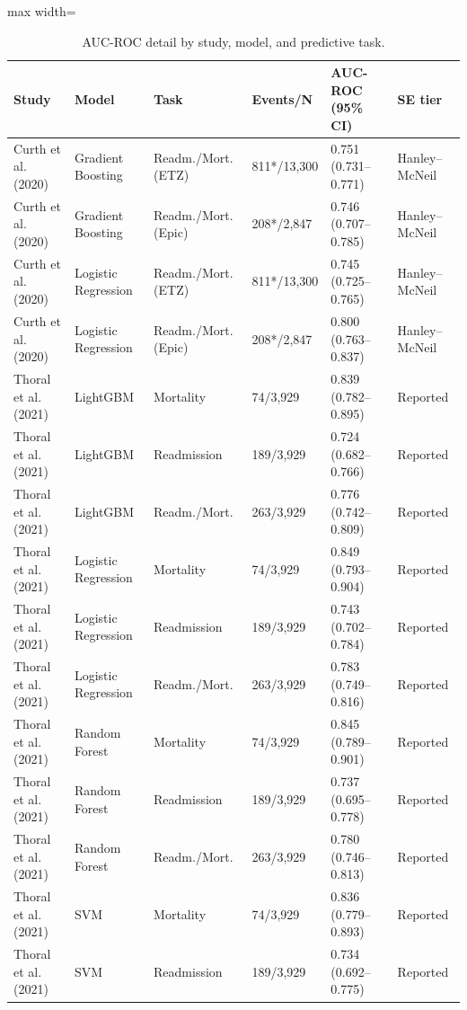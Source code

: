 \begin{table}[H]
\centering
\caption{AUC-ROC detail by study, model, and predictive task.}\label{tab:detalle_auc}
\scriptsize
\begin{adjustbox}{max width=\textwidth}
\begin{tabular}{llllll}
\toprule
\textbf{Study} & \textbf{Model} & \textbf{Task} & \textbf{Events/N} & \textbf{AUC-ROC (95\% CI)} & \textbf{SE tier} \\
\midrule
    Curth et al. (2020) & Gradient Boosting & Readm./Mort. (ETZ) & 811*/13,300 & 0.751 (0.731--0.771) & Hanley--McNeil \\
    Curth et al. (2020) & Gradient Boosting & Readm./Mort. (Epic) & 208*/2,847 & 0.746 (0.707--0.785) & Hanley--McNeil \\
    Curth et al. (2020) & Logistic Regression & Readm./Mort. (ETZ) & 811*/13,300 & 0.745 (0.725--0.765) & Hanley--McNeil \\
    Curth et al. (2020) & Logistic Regression & Readm./Mort. (Epic) & 208*/2,847 & 0.800 (0.763--0.837) & Hanley--McNeil \\
    Thoral et al. (2021) & LightGBM & Mortality & 74/3,929 & 0.839 (0.782--0.895) & Reported \\
    Thoral et al. (2021) & LightGBM & Readmission & 189/3,929 & 0.724 (0.682--0.766) & Reported \\
    Thoral et al. (2021) & LightGBM & Readm./Mort. & 263/3,929 & 0.776 (0.742--0.809) & Reported \\
    Thoral et al. (2021) & Logistic Regression & Mortality & 74/3,929 & 0.849 (0.793--0.904) & Reported \\
    Thoral et al. (2021) & Logistic Regression & Readmission & 189/3,929 & 0.743 (0.702--0.784) & Reported \\
    Thoral et al. (2021) & Logistic Regression & Readm./Mort. & 263/3,929 & 0.783 (0.749--0.816) & Reported \\
    Thoral et al. (2021) & Random Forest & Mortality & 74/3,929 & 0.845 (0.789--0.901) & Reported \\
    Thoral et al. (2021) & Random Forest & Readmission & 189/3,929 & 0.737 (0.695--0.778) & Reported \\
    Thoral et al. (2021) & Random Forest & Readm./Mort. & 263/3,929 & 0.780 (0.746--0.813) & Reported \\
    Thoral et al. (2021) & SVM & Mortality & 74/3,929 & 0.836 (0.779--0.893) & Reported \\
    Thoral et al. (2021) & SVM & Readmission & 189/3,929 & 0.734 (0.692--0.775) & Reported \\

\end{tabular}
\end{adjustbox}
\end{table}
